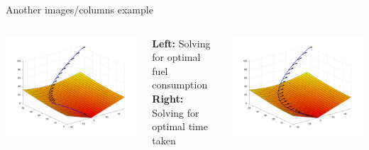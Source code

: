 \documentclass{beamer}
\begin{document}
\begin{frame}{Another images/columns example}
\begin{columns}
\begin{column}{0.35\textwidth}
\includegraphics[width=\textwidth]{plots/min_fuel.png}
\end{column}
\begin{column}{0.3\textwidth}
\textbf{Left:} Solving for optimal fuel consumption \textbf{Right:} Solving for optimal time taken
\end{column}
\begin{column}{0.35\textwidth}
\includegraphics[width=\textwidth]{plots/min_time.png}
\end{column}
\end{columns}
\end{frame}
\end{document}
